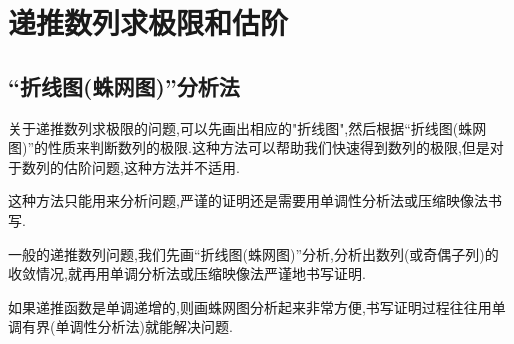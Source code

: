 \documentclass[../../main.tex]{subfiles}%
\begin{document}
\section{递推数列求极限和估阶}


\subsection{“折线图(蛛网图)”分析法}
关于递推数列求极限的问题,可以先画出相应的"折线图",然后根据“折线图(蛛网图)”的性质来判断数列的极限.这种方法可以帮助我们快速得到数列的极限,但是对于数列的估阶问题,这种方法并不适用.

\begin{remark}
这种方法只能用来分析问题,严谨的证明还是需要用单调性分析法或压缩映像法书写.

一般的递推数列问题,我们先画“折线图(蛛网图)”分析,分析出数列(或奇偶子列)的收敛情况,就再用单调分析法或压缩映像法严谨地书写证明.

如果递推函数是单调递增的,则画蛛网图分析起来非常方便,书写证明过程往往用单调有界(单调性分析法)就能解决问题.
\end{remark}
\end{document}
